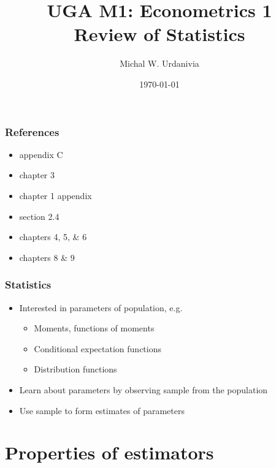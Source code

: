 
\title[Econometrics 1: Statistics]{UGA M1: Econometrics 1\\
  \textbf{Review of Statistics}}
\date{\today}
\author{Michal W. Urdanivia\inst{*}}




\frame{\titlepage}

\begin{frame}
  \tableofcontents  
\end{frame}

\begin{frame}\frametitle{References}
  \begin{itemize}
  \item \cite{w2013} appendix C
  \item \cite{sw2009} chapter 3
  \item \cite{ap2014} chapter 1 appendix
  \item \cite{abbring2001} section 2.4
  \item \cite{dbc2012} chapters 4, 5, \& 6
  \item \cite{gs2003} chapters 8 \& 9
  \end{itemize}
\end{frame}

\begin{frame}
  \frametitle{Statistics}
  \begin{itemize}
  \item Interested in \alert{parameters} of population, e.g.\
    \begin{itemize}
    \item Moments, functions of moments
    \item Conditional expectation functions
    \item Distribution functions      
    \end{itemize}
  \item Learn about parameters by observing sample from the population    
  \item Use sample to form estimates of parameters
  \end{itemize}
\end{frame}

\section{Properties of estimators}

